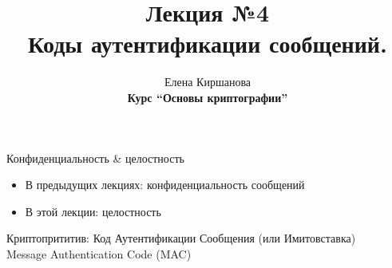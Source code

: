 \documentclass[usenames,dvipsnames,8pt,aspectratio=169]{beamer}
\title{Лекция №4 \\[10pt]
	Коды аутентификации сообщений.}
\date{ Елена Киршанова \\  \textbf{Курс ``Основы криптографии''} \\  }
\begin{document}
	
\begin{frame}
	\titlepage
\end{frame}


\begin{frame}{Конфиденциальность \& целостность}
\LARGE 

\begin{itemize}
	\itemsep 1em
	\item В предыдущих лекциях: {\color{Orange} конфиденциальность} сообщений
	\item В этой лекции:  {\color{Orange} целостность}
\end{itemize}

\vspace{20pt}
\LARGE {\color{Orange}Криптопрититив}: Код Аутентификации Сообщения (или Имитовставка)  \\[5pt] 
Message Authentication Code (MAC) 


\end{frame}
\end{document}
